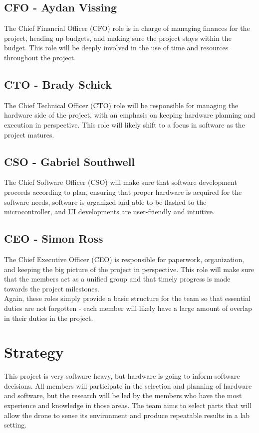 \documentclass[12pt, titlepage]{article}
\begin{document}
\subsection[Chief Financial Officer]{CFO - Aydan Vissing} The Chief Financial Officer (CFO) role is in charge of managing finances for the project, heading up budgets, and making sure the project stays within the budget. This role will be deeply involved in the use of time and resources throughout the project. \\

\subsection[Chief Technical Officer]{CTO - Brady Schick} The Chief Technical Officer (CTO) role will be responsible for managing the hardware side of the project, with an emphasis on keeping hardware planning and execution in perspective. This role will likely shift to a focus in software as the project matures. \\

\subsection[Chief Software Officer]{CSO - Gabriel Southwell} The Chief Software Officer (CSO) will make sure that software development proceeds according to plan, ensuring that proper hardware is acquired for the software needs, software is organized and able to be flashed to the microcontroller, and UI developments are user-friendly and intuitive. \\

\subsection[Chief Executive Officer]{CEO - Simon Ross} The Chief Executive Officer (CEO) is responsible for paperwork, organization, and keeping the big picture of the project in perspective. This role will make sure that the members act as a unified group and that timely progress is made towards the project milestones. \\

Again, these roles simply provide a basic structure for the team so that essential duties are not forgotten - each member will likely have a large amount of overlap in their duties in the project.

\section{Strategy}
This project is very software heavy, but hardware is going to inform software decisions. All members will participate in the selection and planning of hardware and software, but the research will be led by the members who have the most experience and knowledge in those areas. The team aims to select parts that will allow the drone to sense its environment and produce repeatable results in a lab setting.
\end{document}
